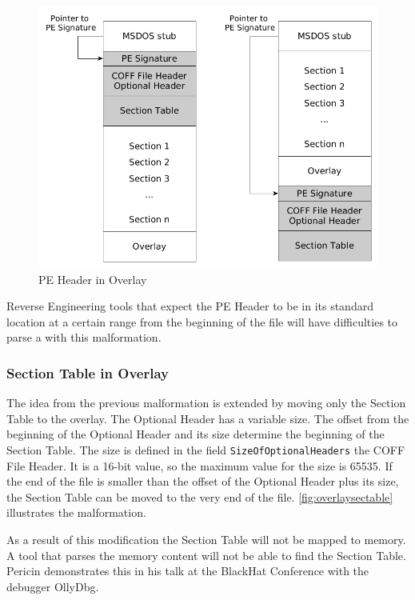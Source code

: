 \begin{figure}
\includegraphics[width=.98\textwidth, height=.60\textheight,keepaspectratio]{graphics/overlayheader}
\caption{PE Header in Overlay }
\label{fig:overlayheader} 
\end{figure}

Reverse Engineering tools that expect the PE Header to be in its standard location at a certain range from the beginning of the file will have difficulties to parse a \PE{} with this malformation.

\subsubsection*{Section Table in Overlay}

The idea from the previous malformation is extended by moving only the Section Table to the overlay. The Optional Header has a variable size. The offset from the beginning of the Optional Header and its size determine the beginning of the Section Table. The size is defined in the field \texttt{SizeOfOptionalHeaders} the COFF File Header. It is a 16-bit value, so the maximum value for the size is 65535. If the end of the file is smaller than the offset of the Optional Header plus its size, the Section Table can be moved to the very end of the file. \autoref{fig:overlaysectable} illustrates the malformation.

As a result of this modification the Section Table will not be mapped to memory. A tool that parses the memory content will not be able to find the Section Table. Pericin demonstrates this in his talk at the BlackHat Conference with the debugger OllyDbg. \cite[min.\thinspace{}14:45]{vuksan11} 

